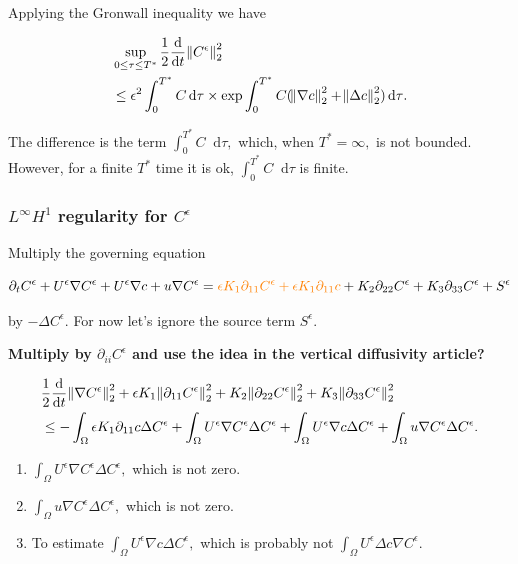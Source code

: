 \documentclass[11pt]{article}
\newcommand*\diff{\mathop{}\!\mathrm{d}}
\begin{document}
Applying the Gronwall inequality we have

\begin{equation}
  \begin{split}
      & \sup_{0 \leq \tau \leq {T^*}}{\frac{1}{2}\frac{\diff}{\diff t} \norm{C^\epsilon}_2^2} \\
      & \leq \epsilon^2 \int_0^{T^*} C \diff \tau \times \exp{ \int_0^{T^*} C (\norm{\nabla c}_2^2 + \norm{\Delta c}_2^2) \diff \tau}.
  \end{split}
\end{equation}

The difference is the term $ \int_0^{T^*} C \diff \tau,$ which, when ${T^*} = \infty,$ is not bounded. However, for a finite $T^*$ time it is ok, $ \int_0^{T^*} C \diff \tau$ is finite.

    \subsubsection{$L^\infty H^1$ regularity for $C^\epsilon$}
Multiply the governing equation

$$ \partial_t C^\epsilon + U^\epsilon \nabla C^\epsilon  + U^\epsilon \nabla c+ u \nabla C^\epsilon = \textcolor{orange}{\epsilon K_1 \partial_{11} C^\epsilon + \epsilon K_1 \partial_{11} c} + K_2 \partial_{22} C^\epsilon + K_3 \partial_{33} C^\epsilon + S^\epsilon $$

by $- \Delta C^\epsilon.$ For now let's ignore the source term $S^\epsilon.$

\textbf{Multiply by $\partial_{ii} C^\epsilon$ and use the idea in the vertical diffusivity article?}

\begin{equation}
  \begin{split}
    & \frac{1}{2} \frac{\diff}{\diff t} \norm{\nabla C^\epsilon}_2^2 + \epsilon K_1 \norm{\partial_{11} C^\epsilon}_2^2 + K_2 \norm{\partial_{22} C^\epsilon}_2^2 + K_3 \norm{\partial_{33} C^\epsilon}_2^2 \\
    & \leq - \int_\Omega \epsilon K_1 \partial_{11} c \Delta C^\epsilon + \int_\Omega U^\epsilon \nabla C^\epsilon \Delta C^\epsilon + \int_\Omega U^\epsilon \nabla c \Delta C^\epsilon + \int_\Omega u \nabla C^\epsilon \Delta C^\epsilon.
  \end{split}
\end{equation}

\begin{enumerate}

  \item $\int_\Omega U^\epsilon \nabla C^\epsilon \Delta C^\epsilon,$ which is not zero.

  \item $\int_\Omega u \nabla C^\epsilon \Delta C^\epsilon,$ which is not zero.

  \item To estimate $\int_\Omega U^\epsilon \nabla c \Delta C^\epsilon,$ which is probably not $\int_\Omega U^\epsilon \Delta c \nabla C^\epsilon.$

\end{enumerate}
\end{document}
